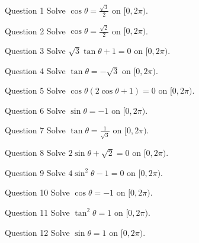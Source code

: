 \documentclass[11pt]{article}
\begin{document}
\begin{qbox}{Question 1}
Solve $\cos\theta=\tfrac{\sqrt3}{2}$ on $[0,2\pi)$.\workspace{2.4cm}
\end{qbox}

\begin{qbox}{Question 2}
Solve $\cos\theta=\tfrac{\sqrt2}{2}$ on $[0,2\pi)$.\workspace{2.4cm}
\end{qbox}

\begin{qbox}{Question 3}
Solve $\sqrt3\tan\theta+1=0$ on $[0,2\pi)$.\workspace{2.4cm}
\end{qbox}

\begin{qbox}{Question 4}
Solve $\tan\theta=-\sqrt3$ on $[0,2\pi)$.\workspace{2.4cm}
\end{qbox}

\begin{qbox}{Question 5}
Solve $\cos\theta(2\cos\theta+1)=0$ on $[0,2\pi)$.\workspace{2.4cm}
\end{qbox}

\begin{qbox}{Question 6}
Solve $\sin\theta=-1$ on $[0,2\pi)$.\workspace{2.4cm}
\end{qbox}

\begin{qbox}{Question 7}
Solve $\tan\theta=\tfrac{1}{\sqrt3}$ on $[0,2\pi)$.\workspace{2.4cm}
\end{qbox}

\begin{qbox}{Question 8}
Solve $2\sin\theta+\sqrt2=0$ on $[0,2\pi)$.\workspace{2.4cm}
\end{qbox}

\begin{qbox}{Question 9}
Solve $4\sin^2\theta-1=0$ on $[0,2\pi)$.\workspace{2.4cm}
\end{qbox}

\begin{qbox}{Question 10}
Solve $\cos\theta=-1$ on $[0,2\pi)$.\workspace{2.4cm}
\end{qbox}

\begin{qbox}{Question 11}
Solve $\tan^2\theta=1$ on $[0,2\pi)$.\workspace{2.4cm}
\end{qbox}

\begin{qbox}{Question 12}
Solve $\sin\theta=1$ on $[0,2\pi)$.\workspace{2.4cm}
\end{qbox}
\end{document}

